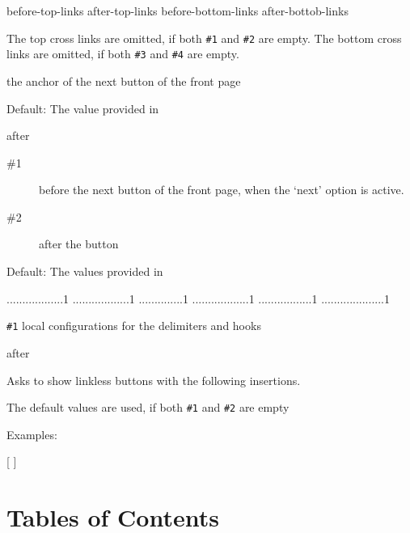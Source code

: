 \documentclass{book}
\begin{document}
 {before-top-links} {after-top-links} {before-bottom-links} {after-bottob-links}\EndDoc

The top cross links are omitted, if both \verb|#1| and \verb|#2| are empty.
The bottom cross links are omitted, if both \verb|#3| and \verb|#4| are empty.

 {the anchor of the next button of the front page}\EndDoc

Default: The value provided in 

 {after}\EndDoc

\begin{description}
  \item[\#1]  before the next button of the front page, when the `next'
       option is active.
  \item[\#2]  after the button
\end{description}

    Default: The values provided in 

\begin{texsource}
..................1
..................1
..............1
..................1
.................1
....................1
\end{texsource}

  \verb|#1| local configurations for the delimiters and hooks

 {after}\EndDoc

Asks to show linkless buttons with the following insertions.

The default values are used, if both \verb|#1| and \verb|#2| are empty

   Examples:

\begin{texsource}

    {[}
    {] }
\end{texsource}

\section{Tables of Contents}
\end{document}
